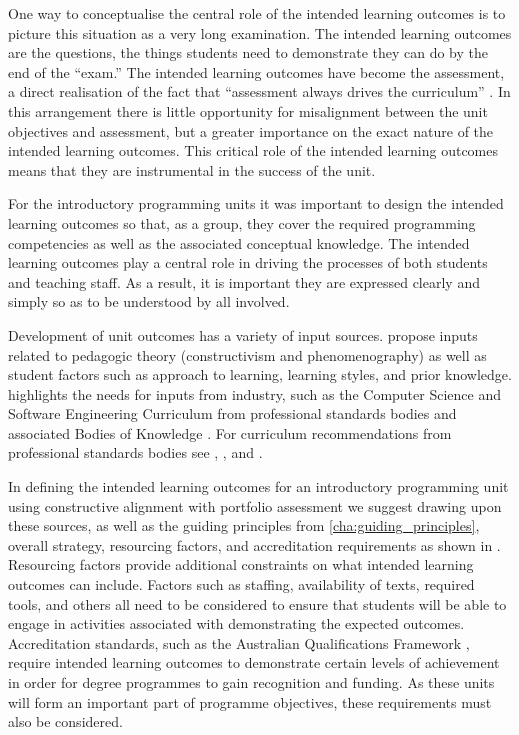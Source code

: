 One way to conceptualise the central role of the intended learning outcomes is to picture this situation as a very long examination. The intended learning outcomes are the questions, the things students need to demonstrate they can do by the end of the ``exam.'' The intended learning outcomes have become the assessment, a direct realisation of the fact that ``assessment always drives the curriculum'' \cite{Ramsden:1992}.  In this arrangement there is little opportunity for misalignment between the unit objectives and assessment, but a greater importance on the exact nature of the intended learning outcomes. This critical role of the intended learning outcomes means that they are instrumental in the success of the unit. 

For the introductory programming units it was important to design the intended learning outcomes so that, as a group, they cover the required programming competencies as well as the associated conceptual knowledge. The intended learning outcomes play a central role in driving the processes of both students and teaching staff. As a result, it is important they are expressed clearly and simply so as to be understood by all involved.

Development of unit outcomes has a variety of input sources. \citet{Thota:2010} propose inputs related to pedagogic theory (constructivism and phenomenography) as well as student factors such as approach to learning, learning styles, and prior knowledge. \citet{Armarego:2009} highlights the needs for inputs from industry, such as the Computer Science and Software Engineering Curriculum from professional standards bodies and associated Bodies of Knowledge \citet{Abran:2001}. For curriculum recommendations from professional standards bodies see \citet{Lethbridge:2006}, \citet{Cassel:2008}, and \citet{CSC2013}.

In defining the intended learning outcomes for an introductory programming unit using constructive alignment with portfolio assessment we suggest drawing upon these sources, as well as the guiding principles from \cref{cha:guiding_principles}, overall strategy, resourcing factors, and accreditation requirements as shown in . Resourcing factors provide additional constraints on what intended learning outcomes can include. Factors such as staffing, availability of texts, required tools, and others all need to be considered to ensure that students will be able to engage in activities associated with demonstrating the expected outcomes. Accreditation standards, such as the Australian Qualifications Framework \cite{AQF:2013}, require intended learning outcomes to demonstrate certain levels of achievement in order for degree programmes to gain recognition and funding. As these units will form an important part of programme objectives, these requirements must also be considered. 


